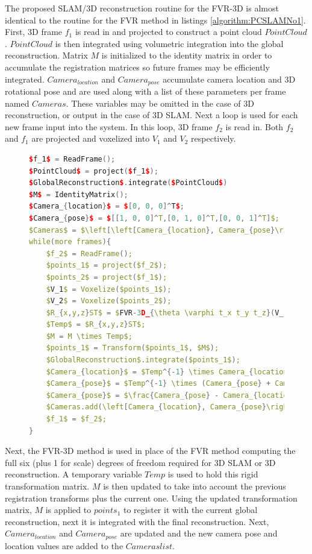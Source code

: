 \label{METHOD_SECLL}

The proposed SLAM/3D reconstruction routine for the FVR-3D is almost identical to the routine for the FVR method in listings \ref{algorithm:PCSLAMNo1}. First, 3D frame $f_1$ is read in and projected to construct a point cloud $PointCloud$. $PointCloud$ is then integrated using volumetric integration into the global reconstruction. Matrix $M$ is initialized to the identity matrix in order to accumulate the registration matrices so future frames may be efficiently integrated. $Camera_{location}$ and $Camera_{pose}$ accumulate camera location and 3D rotational pose and are used along with a list of these parameters per frame named $Cameras$. These variables may be omitted in the case of 3D reconstruction, or output in the case of 3D SLAM. Next a loop is used for each new frame input into the system. In this loop, 3D frame $f_2$ is read in. Both $f_2$ and $f_1$ are projected and voxelized into $V_1$ and $V_2$ respectively. \\

\begin{figure}
\begin{lstlisting}[language=c++,caption=Phase Correlation Based SLAM Algorithm,label=algorithm:FVR3DSLAM,mathescape,basicstyle=\ttfamily]
$f_1$ = ReadFrame();
$PointCloud$ = project($f_1$);
$GlobalReconstruction$.integrate($PointCloud$)
$M$ = IdentityMatrix();
$Camera_{location}$ = $[0, 0, 0]^T$;
$Camera_{pose}$ = $[[1, 0, 0]^T,[0, 1, 0]^T,[0, 0, 1]^T]$;
$Cameras$ = $\left[\left[Camera_{location}, Camera_{pose}\right] \right]$;
while(more frames){
	$f_2$ = ReadFrame();
	$points_1$ = project($f_2$);
	$points_2$ = project($f_1$);
	$V_1$ = Voxelize($points_1$);
	$V_2$ = Voxelize($points_2$);
	$R_{x,y,z}ST$ = $FVR-3D_{\theta \varphi t_x t_y t_z}(V_1, V_2)$;
	$Temp$ = $R_{x,y,z}ST$;
	$M = M \times Temp$;
	$points_1$ = Transform($points_1$, $M$);
	$GlobalReconstruction$.integrate($points_1$);
	$Camera_{location}$ = $Temp^{-1} \times Camera_{location}$;
	$Camera_{pose}$ = $Temp^{-1} \times (Camera_{pose} + Camera_{location})$;
	$Camera_{pose}$ = $\frac{Camera_{pose} - Camera_{location}}{Camera_{pose} - Camera_{location}}$;
	$Cameras.add(\left[Camera_{location}, Camera_{pose}\right])$;
	$f_1$ = $f_2$;
}
\end{lstlisting}
\end{figure}

Next, the FVR-3D method is used in place of the FVR method computing the full six (plus 1 for scale) degrees of freedom required for 3D SLAM or 3D reconstruction. A temporary variable $Temp$ is used to hold this rigid transformation matrix. $M$ is then updated to take into account the previous registration transforms plus the current one. Using the updated transformation matrix, $M$ is applied to $points_1$ to register it with the current global reconstruction, next it is integrated with the final reconstruction. Next, $Camera_{location}$ and $Camera_{pose}$ are updated and the new camera pose and location values are added to the $Cameras list$. \\



